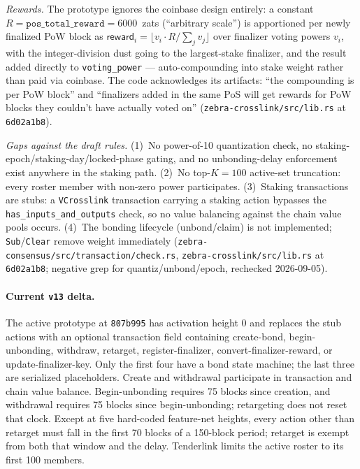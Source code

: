 \documentclass[11pt,a4paper]{article}
\theoremstyle{definition}
\begin{document}
\emph{Rewards.} The prototype ignores the coinbase design entirely: a
constant $R = \texttt{pos\_total\_}\allowbreak\texttt{reward} =
6000$~zats (``arbitrary
scale'') is apportioned per newly finalized PoW block as
$\mathsf{reward}_i = \lfloor v_i \cdot R / \sum_j v_j \rfloor$ over
finalizer voting powers $v_i$, with the integer-division dust going to
the largest-stake finalizer, and the result added directly to
\texttt{voting\_power} --- auto-compounding into stake weight rather
than paid via coinbase. The code acknowledges its artifacts: ``the
compounding is per PoW block'' and ``finalizers added in the same PoS
will get rewards for PoW blocks they couldn't have actually voted on''
(\texttt{zebra-crosslink/src/lib.rs} at \texttt{6d02a1b8}).

\emph{Gaps against the draft rules.} (1)~No power-of-10 quantization
check, no staking-epoch/staking-day/locked-phase gating, and no
unbonding-delay enforcement exist anywhere in the staking path. (2)~No
top-$K = 100$ active-set truncation: every roster member with non-zero
power participates. (3)~Staking transactions are stubs: a
\texttt{VCrosslink} transaction carrying a staking action bypasses the
\texttt{has\_inputs\_and\_outputs} check, so no value balancing against
the chain value pools occurs. (4)~The bonding lifecycle (unbond/claim)
is not implemented; \texttt{Sub}/\texttt{Clear} remove weight
immediately (\texttt{zebra-consensus/src/transaction/check.rs},
\texttt{zebra-crosslink/src/lib.rs} at \texttt{6d02a1b8}; negative grep
for quantiz/unbond/epoch, rechecked 2026-09-05).

\paragraph{Current \texttt{v13} delta.} The active prototype at
\texttt{807b995} has activation height 0 and replaces the stub actions
with an optional transaction field containing create-bond,
begin-unbonding, withdraw, retarget, register-finalizer,
convert-finalizer-reward, or update-finalizer-key. Only the first four
have a bond state machine; the last three are serialized placeholders.
Create and withdrawal participate in transaction and chain value balance.
Begin-unbonding requires 75 blocks since creation, and withdrawal
requires 75 blocks since begin-unbonding; retargeting does not reset that
clock. Except at five hard-coded feature-net heights, every
action other than retarget must fall in the first 70 blocks of a
150-block period; retarget is exempt from both that window and the delay.
Tenderlink limits the active roster to its first 100 members.
\end{document}
